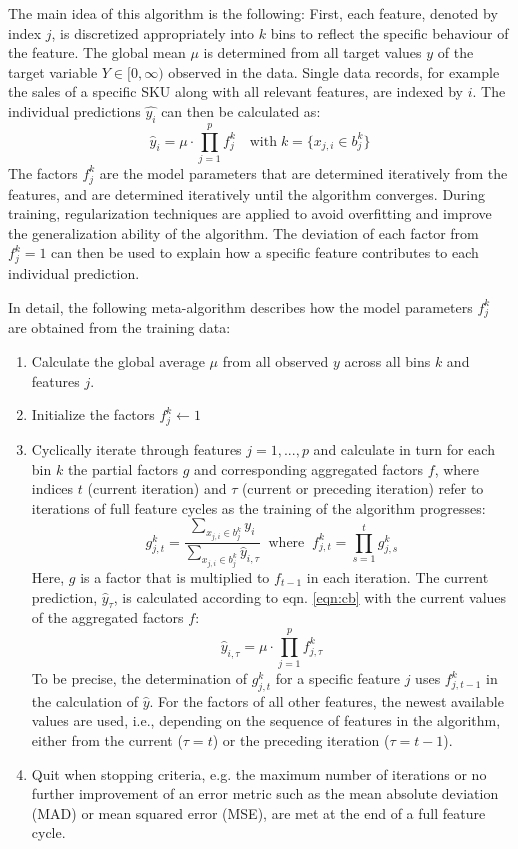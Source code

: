 \documentclass[BCOR=1mm, DIV=calc,10pt,
twoside=true,
twocolumn,
headings=normal]{scrartcl}
\begin{document}
The main idea of this algorithm is the following: First, each feature, denoted by index $j$, is discretized appropriately into $k$ bins to reflect the specific behaviour of the feature. The global mean $\mu$ is determined from all target values $y$ of the  target variable $Y \in [0,\infty)$ observed in the data. Single data records, for example the sales of a specific SKU along with all relevant features, are indexed by $i$.
The individual predictions $\hat{y_i}$  can then be calculated as:
\begin{equation} \label{eqn:cb}
\hat{y}_i = \mu \cdot \prod \limits_{j=1}^p f^k_j \quad \text{with}\; k=\{ x_{j,i} \in b^k_j\}
\end{equation}
The factors $f^k_j$ are the model parameters that are determined iteratively from the features, and are determined iteratively until the algorithm converges. During training,  regularization techniques are applied to avoid overfitting and improve the generalization ability of the algorithm. The deviation of each factor from $f^k_j=1$ can then be used to explain how a  specific feature contributes to each individual prediction.

In detail, the following meta-algorithm describes how the model parameters $f^k_j$ are obtained from the training data:
\begin{enumerate}
\item{Calculate the global average $\mu$ from all observed $y$ across all bins $k$ and features $j$.}
\item{Initialize the factors $f^k_j \leftarrow 1$}
\item{Cyclically iterate through features $j = 1,...,p $ and calculate in turn for each bin $k$ the partial factors $g$ and corresponding aggregated factors $f$, where indices $t$ (current iteration) and $\tau$ (current or preceding iteration) refer to iterations of full feature cycles as the training of the algorithm progresses:
\begin{equation} \label{factors}
g^k_{j,t} = \frac{\sum \limits_{x_{j,i} \in b^k_j} y_i}{\sum \limits_{x_{j,i} \in b^k_j} \hat{y}_{i,\tau}}\;\; \mathrm{where} \; \; f^k_{j,t} = \prod \limits_{s=1}^t g^k_{j,s}
\end{equation}
Here,  $g$ is a factor that is multiplied to $f_{t-1}$ in each iteration. The current prediction, $\hat{y}_\tau$, is calculated according to eqn. \ref{eqn:cb} with the current values of the aggregated factors $f$:
\begin{equation} \label{factors3}
\hat{y}_{i,\tau} = \mu \cdot \prod \limits_{j=1}^p f^k_{j,\tau}
\end{equation}
To be precise, the determination of $g^k_{j,t}$ for a specific feature $j$ uses $f^k_{j,t-1}$ in the calculation of $\hat{y}$. For the factors of all other features, the newest available values are used, i.e., depending on the sequence of features in the algorithm, either from the current ($\tau=t$) or the preceding iteration ($\tau=t-1$).}
\item{Quit when stopping criteria, e.g. the maximum number of iterations or no further improvement of an error metric such as the mean absolute deviation (MAD) or mean squared error (MSE), are met at the end of a full feature cycle.}
\end{enumerate}
\end{document}
